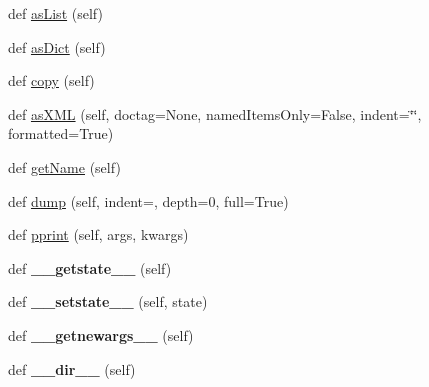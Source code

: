\begin{DoxyCompactItemize}
\item 
def \hyperlink{classsetuptools_1_1__vendor_1_1pyparsing_1_1_parse_results_a8d1cc9ef72b2fcf972c240eae0e59e87}{as\+List} (self)
\item 
def \hyperlink{classsetuptools_1_1__vendor_1_1pyparsing_1_1_parse_results_aa94e10c70716802a5bd2d265bbaa2f65}{as\+Dict} (self)
\item 
def \hyperlink{classsetuptools_1_1__vendor_1_1pyparsing_1_1_parse_results_a5783f341eb651c8c6e2f3b0713afe18b}{copy} (self)
\item 
def \hyperlink{classsetuptools_1_1__vendor_1_1pyparsing_1_1_parse_results_a1ef3733e1f8c5c2ad4a759b9c01809a9}{as\+X\+ML} (self, doctag=None, named\+Items\+Only=False, indent=\char`\"{}\char`\"{}, formatted=True)
\item 
def \hyperlink{classsetuptools_1_1__vendor_1_1pyparsing_1_1_parse_results_ab2ae7e5ea94c1e158d059aa90172f666}{get\+Name} (self)
\item 
def \hyperlink{classsetuptools_1_1__vendor_1_1pyparsing_1_1_parse_results_a1a4a3dd9ab26677a709fdcbb2289da04}{dump} (self, indent=\textquotesingle{}\textquotesingle{}, depth=0, full=True)
\item 
def \hyperlink{classsetuptools_1_1__vendor_1_1pyparsing_1_1_parse_results_a9222a3ef2d28e03e33d1133e56d34f80}{pprint} (self, args, kwargs)
\item 
\mbox{\label{classsetuptools_1_1__vendor_1_1pyparsing_1_1_parse_results_a8ac5d89ea8699d3cb6b601efeb6b9de9}} 
def {\bfseries \+\_\+\+\_\+getstate\+\_\+\+\_\+} (self)
\item 
\mbox{\label{classsetuptools_1_1__vendor_1_1pyparsing_1_1_parse_results_a8efc6986ac4efd0d9bf56e80af46cc97}} 
def {\bfseries \+\_\+\+\_\+setstate\+\_\+\+\_\+} (self, state)
\item 
\mbox{\label{classsetuptools_1_1__vendor_1_1pyparsing_1_1_parse_results_adf1b9139ba77e4e4512b00884948d09d}} 
def {\bfseries \+\_\+\+\_\+getnewargs\+\_\+\+\_\+} (self)
\item 
\mbox{\label{classsetuptools_1_1__vendor_1_1pyparsing_1_1_parse_results_ae08d47601b2dd93b451b7df74b3d8b7c}} 
def {\bfseries \+\_\+\+\_\+dir\+\_\+\+\_\+} (self)
\end{DoxyCompactItemize}
